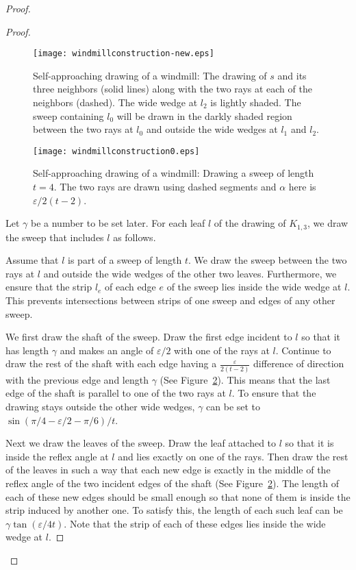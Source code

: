 \documentclass[11pt]{article}
\newcommand{\changeAL}[1]{{#1}}
\newcommand{\changeS}[1]{{#1}}
\begin{document}
\begin{proof}
\begin{proof}
\begin{figure}
\begin{center}
\texttt{[image: windmillconstruction-new.eps]}
\caption{
\changeAL{Self-approaching drawing of a windmill: The drawing of $s$ and its three neighbors (solid lines) along with the two rays at each of the neighbors (dashed). The wide wedge at $l_2$ is lightly shaded.  The sweep containing $l_0$ will be drawn in the darkly shaded region between the two rays at $l_0$ and outside the wide wedges at $l_1$ and $l_2$.}
}
\label{fig:rays}
\end{center}
\end{figure}


\begin{figure}
\begin{center}
\texttt{[image: windmillconstruction0.eps]}
\caption{Self-approaching drawing of a windmill: Drawing a sweep of \changeAL{length $t=4$}. The two rays are drawn using dashed segments and
\changeAL{$\alpha$ here is $\varepsilon/2(t-2)$.}}
\label{windmillembeddfig2}
\end{center}
\end{figure}



Let $\gamma$ be a number to be set later. For each leaf $l$ of the drawing of $K_{1,3}$, we draw the sweep that includes $l$ as follows. \changeAL{Assume that $l$ is part of a sweep of length $t$. We draw the sweep between the two rays at $l$ and outside the wide wedges of the other two leaves.
Furthermore,  we ensure that  the strip $l_e$ of each edge $e$ of the sweep lies inside the wide wedge at $l$.  This prevents intersections between strips of one sweep and edges of any other sweep.


We first draw the shaft of the sweep.
Draw the first edge incident to $l$ so that it has length $\gamma$ and makes an angle of  $\varepsilon/2$  with one of the rays at $l$. Continue to draw the rest of the shaft with each edge having a $\frac{\varepsilon}{2(t-2)}$ difference of direction with the previous edge and length $\gamma$ (See Figure~\ref{windmillembeddfig2}). This means that the last edge of the shaft is parallel to one of the two rays at $l$.
To ensure that the drawing stays outside the other wide wedges,
$\gamma$ can be set to $\sin(\pi/4-\varepsilon/2-\pi/6)/t$.





Next we draw the leaves of the sweep.
Draw the leaf attached to $l$ so that it is inside the reflex angle at $l$ and lies exactly on one of the rays. Then draw the rest of the leaves in such a way that each new edge is exactly in the middle of the reflex angle of the two incident edges of the shaft (See Figure~\ref{windmillembeddfig2}). The length of each of these new edges should be small enough so that none of them is inside the strip induced by another one. To satisfy this, the length of each such leaf can be \changeS{$\gamma\tan (\varepsilon/4t)$.}
Note that the strip of each of these edges lies inside the wide wedge at $l$.
}
\end{proof}



\end{proof}
\end{document}
